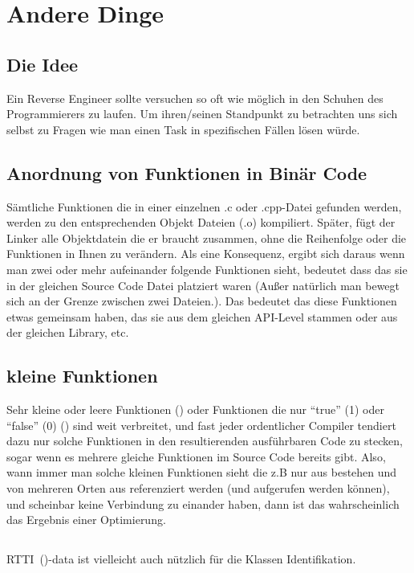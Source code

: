 \section{Andere Dinge}

\subsection{Die Idee}  

Ein Reverse Engineer sollte versuchen so oft wie m\"oglich in den Schuhen des
Programmierers zu laufen. Um ihren/seinen Standpunkt zu betrachten uns sich
selbst zu Fragen wie man einen Task in spezifischen F\"allen l\"osen w\"urde.

\subsection{Anordnung von Funktionen in Bin\"ar Code}  

S\"amtliche Funktionen die in einer einzelnen .c oder .cpp-Datei gefunden werden,
werden zu den entsprechenden Objekt Dateien (.o) kompiliert. Sp\"ater, f\"ugt
der Linker alle Objektdatein die er braucht zusammen, ohne die Reihenfolge oder
die Funktionen in Ihnen zu ver\"andern. Als eine Konsequenz, ergibt sich daraus
wenn man zwei oder mehr aufeinander folgende Funktionen sieht, bedeutet dass das
sie in der gleichen Source Code Datei platziert waren (Außer nat\"urlich man bewegt
sich an der Grenze zwischen zwei Dateien.). Das bedeutet das diese Funktionen etwas
gemeinsam haben, das sie aus dem gleichen \ac{API}-Level stammen oder aus der
gleichen Library, etc.

\subsection{kleine Funktionen} 

Sehr kleine oder leere Funktionen  ()
oder Funktionen die nur ``true'' (1) oder ``false'' (0) () sind weit verbreitet,
und fast jeder ordentlicher Compiler tendiert dazu nur solche Funktionen in den resultierenden ausf\"uhrbaren Code zu stecken,
sogar wenn es mehrere gleiche Funktionen im Source Code bereits gibt. 
Also, wann immer man solche kleinen Funktionen sieht die z.B nur aus  bestehen und von mehreren 
Orten aus referenziert werden (und aufgerufen werden k\"onnen), und scheinbar keine Verbindung zu einander haben, dann 
ist das wahrscheinlich das Ergebnis einer Optimierung. 

\subsection{\Cpp}

\ac{RTTI}~()-data ist vielleicht auch n\"utzlich f\"ur die \Cpp Klassen Identifikation.
